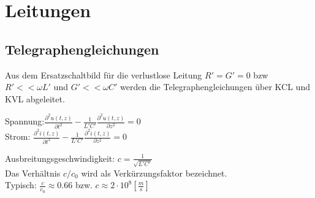 \documentclass[english]{latex4ei/latex4ei_sheet}
\begin{document}
\section{Leitungen}
\begin{sectionbox}
\subsection{Telegraphengleichungen}
Aus dem Ersatzschaltbild für die verlustlose Leitung $R'=G'=0$ bzw $R'<< \omega L'$ und $G' << \omega C'$ werden die Telegraphengleichungen über KCL und KVL abgeleitet.

\begin{emphbox}
Spannung:\qquad	$\frac{\partial^2 u(t,z)}{\partial t^2} - \frac{1}{L' C'} \frac{\partial^2 u(t,z)}{\partial z^2} = 0$\\
Strom:	\qquad $\frac{\partial^2 i(t,z)}{\partial t^2} - \frac{1}{L' C'} \frac{\partial^2 i(t,z)}{\partial z^2} = 0$\\
\end{emphbox}
Ausbreitungsgeschwindigkeit: $c=\frac{1}{\sqrt{L' C'}}$\\
Das Verhältnis $c/c_0$ wird als Verkürzungsfaktor bezeichnet.\\
Typisch: $\frac{c}{c_0} \approx 0.66$ bzw. $c\approx 2 \cdot 10^8 [\frac{m}{s}]$\\

\end{sectionbox}
\end{document}
